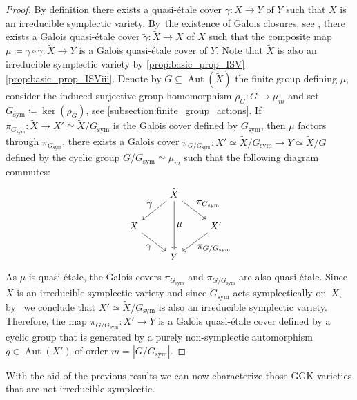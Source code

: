 \documentclass[JEP,XML,SOM,Unicode,published]{cedram}
\let\ts\textstyle
\theoremstyle{plain}
\theoremstyle{definition}
\DeclareMathOperator{\Aut}{Aut}
\begin{document}
\begin{proof}
By definition there exists a quasi-étale cover $\gamma\colon X\to Y$ of $Y$ such that $X$ is an irreducible symplectic variety. By~the existence of Galois closures, see \cite[Th.\,3.7]{GKP16a}, there exists a Galois quasi-étale cover $\widetilde{\gamma}\colon \widetilde{X}\to X$ of $X$ such that the composite map $\mu\coloneqq \gamma \circ \widetilde{\gamma} \colon \widetilde{X}\to Y$ is a Galois quasi-étale cover of $Y$. Note that $\widetilde{X}$ is also an irreducible symplectic variety by \autoref{prop:basic_prop_ISV}\eqref{prop:basic_prop_ISViii}.
Denote by $G \subseteq \Aut(\widetilde{X})$ the finite group defining $\mu$, consider the induced surjective group homomorphism $\rho_G\colon G\to \mu_m$ and set $ G_\text{sym} \coloneqq \ker(\rho_G)$, see \autoref{subsection:finite_group_actions}.
If $\pi_{G_\text{sym}} \colon \widetilde{X}\to X' \simeq \widetilde{X}/{G_\text{sym}}$ is the Galois cover defined by $G_\text{sym}$, then $\mu$ factors through $\pi_{G_\text{sym}}$, \ie there exists a Galois cover $\pi_{G/G_\text{sym}}\colon X' \simeq \widetilde{X}/{G_\text{sym}} \to Y \simeq \widetilde{X}/G$ defined by the cyclic group $G/{G_\text{sym}}\simeq \mu_m$
such that the following diagram commutes:
\[
\begin{tikzcd}
& \widetilde{X} \arrow[ld, "\ts \widetilde \gamma"'] \arrow[rd, "\ts \pi_{G_\text{sym}}"] \arrow[dd, "\ts \mu"]& \\
X \arrow[rd, "\ts \gamma"'] & & X' \arrow[ld, "\ts \pi_{G/G_\text{sym}}"] \\
& Y &
\end{tikzcd}
\]
As $\mu$ is quasi-étale, the Galois covers $\pi_{G_\text{sym}}$ and $\pi_{G/{G_\text{sym}}}$ are also quasi-étale. Since~$\widetilde{X}$ is an irreducible symplectic variety and since $G_\text{sym}$ acts symplectically on~$\widetilde{X}$, by~\cite[Prop.\,3.17]{BGMM25} we conclude that $X' \simeq \widetilde{X}/{G_\text{sym}}$ is also an irreducible symplectic variety.
Therefore, the map $\pi_{G/{G_{\text{sym}}}} \colon X'\to Y $ is a Galois quasi-étale cover defined by a cyclic group that is generated by a purely non-symplectic automorphism $g \in \Aut(X')$ of order $m=| G / G_\text{sym} |$.
\end{proof}

With the aid of the previous results we can now characterize those GGK varieties that are not irreducible symplectic.
\end{document}
